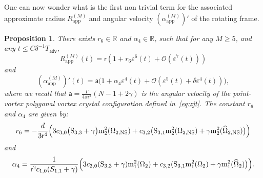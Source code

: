 \documentclass[11pt,reqno,a4paper]{amsart}
\def\eps{\varepsilon}
\def\R {\mathbb{R}} %
\newcommand{\cO}{\mathcal{O}}
\newcommand{\adv}{\mathsf{adv}}
\newcommand{\mrm}{\mathrm{m}}
\newcommand{\1}{\mathbbm{1}}
\newtheorem{proposition}{Proposition}[section]
\theoremstyle{definition}
\theoremstyle{definition}
\numberwithin{equation}{section}
\newcommand{\Mapp}[2]{#1^{(#2)}_\mathrm{app}}
\begin{document}
One can now wonder what is the first non trivial term for the associated approximate radius $\Mapp{R}{M}$ and angular velocity $(\Mapp{\alpha}{M})'$ of the rotating frame.
\begin{proposition}\label{prop:deviation}
   There exists $r_6 \in \R$ and $\alpha_4 \in \R$, such that for any $M \ge 5$, and any $t \le C \delta^{-1} T_\adv$,
    \begin{equation}
        \Mapp{R}{M}(t) = \mathsf{r}(1 + r_6 \eps^6(t) + \cO(\eps^7(t)))
    \end{equation}
    and
    \begin{equation}
        (\Mapp{\alpha}{M})'(t) = \mathsf{a}\big(1 + 
        \alpha_4\eps^4(t)  + \cO(\eps^5(t) + \delta \eps^4(t))\big),
    \end{equation}
    where we recall that $\mathsf{a}=\frac{\Gamma}{4\pi \mathsf{r}^2}(N-1+2\gamma)$ is the angular velocity of the point-vortex polygonal vortex crystal configuration defined in~\cref{eq:zjt}. The constant $r_6$ and $\alpha_4$ are given by:
    \begin{equation}
        r_6 = -\frac{d}{3\mathsf{r}^4}\Big( 3c_{3,0} \big( {\rm S}_{3,3}  + \gamma\big) \mrm_2^{2}(\Omega_{2,\mathrm{NS}}) + c_{3,2} \big( {\rm S}_{3,1} \mrm_2^2( \Omega_{2,\mathrm{NS}}) + \gamma \mrm_2^2( \widehat{\Omega}_{2,\mathrm{NS}})\big) \Big)
    \end{equation}
    and
    \begin{equation}
      \label{def:alha4}  \alpha_4 =\frac{1}{\mathsf{r}^2c_{1,0}(S_{1,1}+\gamma)} \Big(3c_{3,0}({\rm S}_{3,3}+\gamma) \mrm_1^2(\Omega_2) + c_{3,2} ({\rm S}_{3,1} \mrm_1^2(\Omega_2)+\gamma \mrm_1^2(\widehat{\Omega}_2)\big) \Big).
    \end{equation}
\end{proposition}
\end{document}
